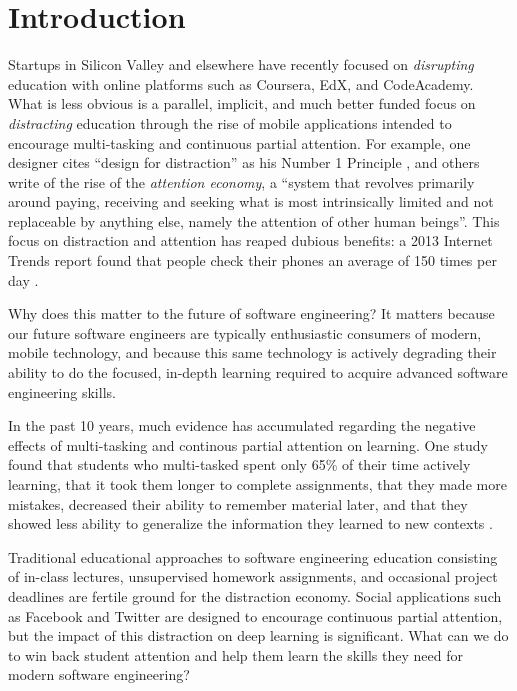 \section{Introduction}

Startups in Silicon Valley and elsewhere have recently focused on {\em disrupting} education with online platforms such as Coursera, EdX, and CodeAcademy.  What is less obvious is a parallel, implicit, and much better funded focus on {\em distracting} education through the rise of mobile applications intended to encourage multi-tasking and continuous partial attention. For example, one designer cites ``design for distraction'' as his Number 1 Principle \cite{Wroblewski2014}, and others write of the rise of the {\em attention economy}, a ``system that revolves primarily around paying, receiving and seeking what is most intrinsically limited and not replaceable by anything else, namely the attention of other human beings''\cite{Chamorro-Premuzic2014}. This focus on distraction and attention has reaped dubious benefits: a 2013 Internet Trends report found that people check their phones an average of 150 times per day \cite{Meeker2013}. 

Why does this matter to the future of software engineering?  It matters because our future software engineers are typically enthusiastic consumers of modern, mobile technology, and because this same technology is actively degrading their ability to do the focused, in-depth learning required to acquire advanced software engineering skills.  

In the past 10 years, much evidence has accumulated regarding the negative effects of multi-tasking and continous partial attention on learning. One study found that students who multi-tasked spent only 65\% of their time actively learning, that it took them longer to complete assignments, that they made more mistakes, decreased their ability to remember material later, and that they showed less ability to generalize the information they learned to new contexts \cite{Paul2013}. 

Traditional educational approaches to software engineering education consisting of in-class lectures, unsupervised homework assignments, and occasional project deadlines are fertile ground for the distraction economy.  Social applications such as Facebook and Twitter are designed to encourage continuous partial attention, but the impact of this distraction on deep learning is significant.  What can we do to win back student attention and help them learn the skills they need for modern software engineering? 

